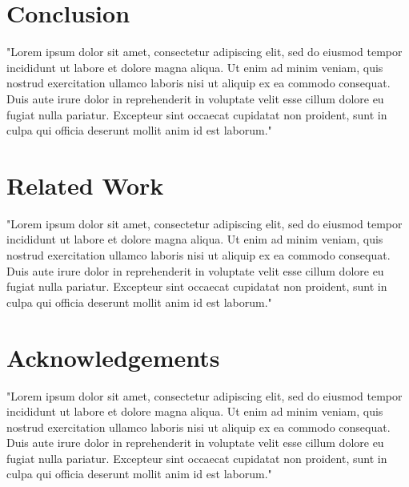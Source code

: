 \documentclass[11pt,twocolumn]{article}
\begin{document}
\section{Conclusion}
"Lorem ipsum dolor sit amet, consectetur adipiscing elit, sed do eiusmod tempor incididunt ut labore et dolore magna aliqua. Ut enim ad minim veniam, quis nostrud exercitation ullamco laboris nisi ut aliquip ex ea commodo consequat. Duis aute irure dolor in reprehenderit in voluptate velit esse cillum dolore eu fugiat nulla pariatur. Excepteur sint occaecat cupidatat non proident, sunt in culpa qui officia deserunt mollit anim id est laborum."

\section{Related Work}
"Lorem ipsum dolor sit amet, consectetur adipiscing elit, sed do eiusmod tempor incididunt ut labore et dolore magna aliqua. Ut enim ad minim veniam, quis nostrud exercitation ullamco laboris nisi ut aliquip ex ea commodo consequat. Duis aute irure dolor in reprehenderit in voluptate velit esse cillum dolore eu fugiat nulla pariatur. Excepteur sint occaecat cupidatat non proident, sunt in culpa qui officia deserunt mollit anim id est laborum."

\section{Acknowledgements}
"Lorem ipsum dolor sit amet, consectetur adipiscing elit, sed do eiusmod tempor incididunt ut labore et dolore magna aliqua. Ut enim ad minim veniam, quis nostrud exercitation ullamco laboris nisi ut aliquip ex ea commodo consequat. Duis aute irure dolor in reprehenderit in voluptate velit esse cillum dolore eu fugiat nulla pariatur. Excepteur sint occaecat cupidatat non proident, sunt in culpa qui officia deserunt mollit anim id est laborum."
\end{document}
